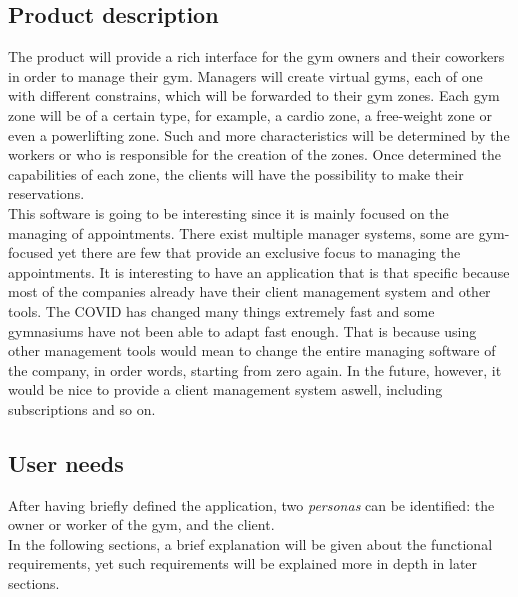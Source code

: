 \documentclass[a4paper, 12pt, oneside]{book}
\begin{document}
\subsection{Product description}
The product will provide a rich interface for the gym owners and their coworkers in order to manage their gym. Managers will create virtual gyms, each of one with different constrains, which will be forwarded to their gym zones. Each gym zone will be of a certain type, for example, a cardio zone, a free-weight zone or even a powerlifting zone. Such and more characteristics will be determined by the workers or who is responsible for the creation of the zones. Once determined the capabilities of each zone, the clients will have the possibility to make their reservations.
\\[8pt]
This software is going to be interesting since it is mainly focused on the managing of appointments. There exist multiple manager systems, some are gym-focused yet there are few that provide an exclusive focus to managing the appointments. It is interesting to have an application that is that specific because most of the companies already have their client management system and other tools. The COVID has changed many things extremely fast and some gymnasiums have not been able to adapt fast enough. That is because using other management tools would mean to change the entire managing software of the company, in order words, starting from zero again. In the future, however, it would be nice to provide a client management system aswell, including subscriptions and so on.
\subsection{User needs}
After having briefly defined the application, two \emph{personas} can be identified: the owner or worker of the gym, and the client.
\\[8pt]
In the following sections, a brief explanation will be given about the functional requirements, yet such requirements will be explained more in depth in later sections.
\end{document}
